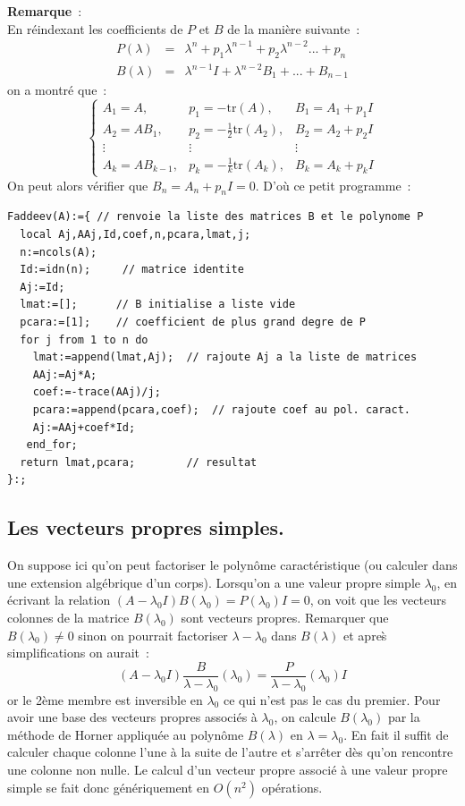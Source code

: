 \documentclass[a4paper,11pt]{book}
\begin{document}
\begin{giacjshere}
{\bf Remarque}~:\\
En réindexant les coefficients de $P$ et $B$ de la manière suivante~:
\begin{eqnarray*}
P(\lambda) &=& \lambda^n+p_1\lambda^{n-1}+p_2\lambda^{n-2}...+p_n \\
B(\lambda) &=& \lambda^{n-1}I+\lambda^{n-2}B_1+...+B_{n-1}
\end{eqnarray*}
on a montré que~:
\[ \left\{
\begin{array}{ccc}
A_1=A, & p_1=-\mbox{tr}(A), & B_1=A_1+p_1I \\  
A_2=AB_1, & p_2=-\frac{1}{2}\mbox{tr}(A_2), & B_2=A_2+p_2I \\ 
\vdots & \vdots & \vdots \\
A_k=AB_{k-1}, & p_k=-\frac{1}{k}\mbox{tr}(A_k), & B_k=A_k+p_kI
\end{array}
\right.\]
On peut alors vérifier que $B_n=A_n+p_nI=0$.
D'où ce petit programme~:
\begin{verbatim}
Faddeev(A):={ // renvoie la liste des matrices B et le polynome P
  local Aj,AAj,Id,coef,n,pcara,lmat,j;
  n:=ncols(A);
  Id:=idn(n);     // matrice identite
  Aj:=Id;
  lmat:=[];      // B initialise a liste vide
  pcara:=[1];    // coefficient de plus grand degre de P
  for j from 1 to n do
    lmat:=append(lmat,Aj);  // rajoute Aj a la liste de matrices
    AAj:=Aj*A;
    coef:=-trace(AAj)/j;    
    pcara:=append(pcara,coef);  // rajoute coef au pol. caract.
    Aj:=AAj+coef*Id;
   end_for;
  return lmat,pcara;        // resultat
}:;
\end{verbatim}

\subsection{Les vecteurs propres simples.}
On suppose ici qu'on peut factoriser le polyn\^ome caract\'eristique
(ou calculer dans une extension alg\'ebrique d'un corps).
Lorsqu'on a une valeur propre simple $\lambda_0$, en \'ecrivant
la relation $(A-\lambda_0 I)B(\lambda_0)=P(\lambda_0)I=0$,
on voit que les vecteurs colonnes de la matrice $B(\lambda_0)$
sont vecteurs propres.
Remarquer que $B(\lambda_0) \neq 0$ sinon on pourrait factoriser
$\lambda-\lambda_0$ dans $B(\lambda)$ et apre\`s simplifications on aurait~:
\[(A-\lambda_0 I)\frac{B}{\lambda-\lambda_0}(\lambda_0)=
\frac{P}{\lambda-\lambda_0}(\lambda_0)I \]
or le 2\`eme membre est inversible en $\lambda_0$ ce qui n'est pas le
cas du premier.
Pour avoir une base des vecteurs propres associ\'es \`a $\lambda_0$, on
calcule $B(\lambda_0) $ par la m\'ethode de Horner appliqu\'ee au
polyn\^ome $B(\lambda)$ en $\lambda=\lambda_0$. En fait il suffit de
calculer chaque colonne l'une \`a la suite de l'autre et s'arr\^eter
d\`es qu'on rencontre une colonne non nulle. Le calcul d'un vecteur
propre associ\'e \`a une valeur propre simple 
se fait donc g\'en\'eriquement en $O(n^2)$ op\'erations. 


\end{giacjshere}
\end{document}

